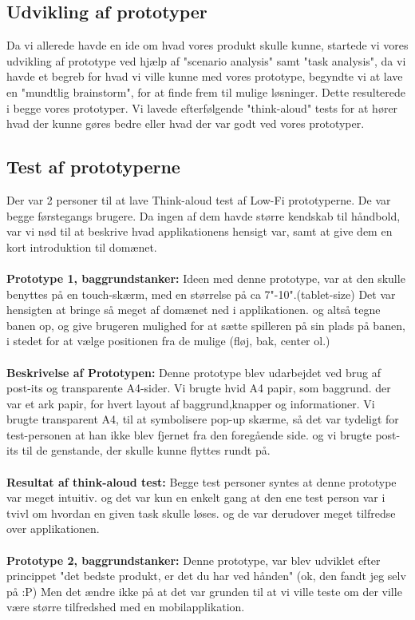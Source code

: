 \subsection*{Udvikling af prototyper}
Da vi allerede havde en ide om hvad vores produkt skulle kunne, startede vi vores udvikling af prototype ved hjælp af "scenario analysis" samt "task analysis", da vi havde et begreb for hvad vi ville kunne med vores prototype, begyndte vi at lave en "mundtlig brainstorm", for at finde frem til mulige løsninger. Dette resulterede i begge vores prototyper. Vi lavede efterfølgende "think-aloud" tests for at hører hvad der kunne gøres bedre eller hvad der var godt ved vores prototyper.

\subsection*{Test af prototyperne}
Der var 2 personer til at lave Think-aloud test af Low-Fi prototyperne. De var begge førstegangs brugere. Da ingen af dem havde større kendskab til håndbold, var vi nød til at beskrive hvad applikationens hensigt var, samt at give dem en kort introduktion til domænet.\\\\ \textbf{Prototype 1, baggrundstanker:}
Ideen med denne prototype, var at den skulle benyttes på en touch-skærm, med en størrelse på ca 7"-10".(tablet-size)
Det var hensigten at bringe så meget af domænet ned i applikationen. og altså tegne banen op, og give brugeren mulighed for at sætte spilleren på sin plads på banen, i stedet for at vælge positionen fra de mulige (fløj, bak, center ol.)\\\\ \textbf{Beskrivelse af Prototypen:} Denne prototype blev udarbejdet ved brug af post-its og transparente A4-sider. Vi brugte hvid A4 papir, som baggrund. der var et ark papir, for hvert layout af baggrund,knapper og informationer.
Vi brugte transparent A4, til at symbolisere pop-up skærme, så det var tydeligt for test-personen at han ikke blev fjernet fra den foregående side.
og vi brugte post-its til de genstande, der skulle kunne flyttes rundt på.\\\\\textbf{Resultat af think-aloud test:} Begge test personer syntes at denne prototype var meget intuitiv. og det var kun en enkelt gang at den ene test person var i tvivl om hvordan en given task skulle løses. og de var derudover meget tilfredse over applikationen.\\\\ \textbf{Prototype 2, baggrundstanker:} Denne prototype, var blev udviklet efter princippet "det bedste produkt, er det du har ved hånden" (ok, den fandt jeg selv på :P) Men det ændre ikke på at det var grunden til at vi ville teste om der ville være større tilfredshed med en mobilapplikation.
